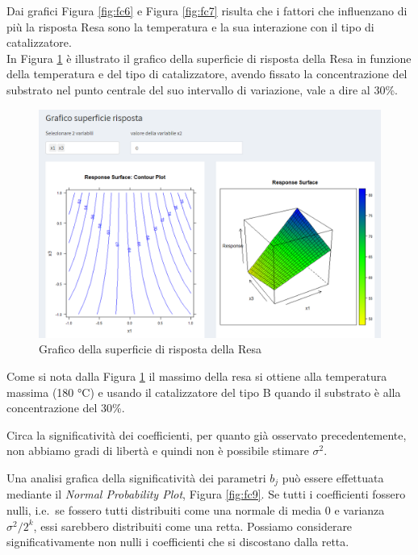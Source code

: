 \documentclass[
  11pt,
]{book}
\begin{document}
Dai grafici Figura \ref{fig:fc6} e Figura \ref{fig:fc7} risulta che i fattori
che influenzano di più la risposta Resa sono la temperatura e la sua
interazione con il tipo di catalizzatore.\\
In Figura \ref{fig:fc8} è illustrato il grafico della superficie di
risposta della Resa in funzione della temperatura e del tipo di
catalizzatore, avendo fissato la concentrazione del substrato nel punto
centrale del suo intervallo di variazione, vale a dire al 30\%.

\begin{figure}

{\centering \includegraphics[width=1\linewidth]{Immagini/Fatt_compl/08_sup_risp} 

}

\caption{Grafico della superficie di risposta della Resa}\label{fig:fc8}
\end{figure}

Come si nota dalla Figura \ref{fig:fc8} il massimo della resa si ottiene
alla temperatura massima (180 °C) e usando il catalizzatore del tipo B
quando il substrato è alla concentrazione del 30\%.

Circa la significatività dei coefficienti, per quanto già osservato
precedentemente, non abbiamo gradi di libertà e quindi non è possibile
stimare \(\sigma^2\).

Una analisi grafica della significatività dei parametri \(b_j\) può essere
effettuata mediante il \emph{Normal Probability Plot}, Figura \ref{fig:fc9}. Se
tutti i coefficienti fossero nulli, i.e.~se fossero tutti distribuiti
come una normale di media \(0\) e varianza \(\sigma^2/2^k\), essi sarebbero
distribuiti come una retta. Possiamo considerare significativamente non
nulli i coefficienti che si discostano dalla retta.
\end{document}
